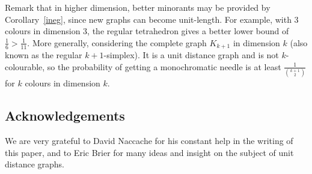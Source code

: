 \documentclass[a4paper,11pt]{article}
\theoremstyle{definition}
\theoremstyle{remark}
\begin{document}
Remark that in higher dimension, better minorants may be provided by 
Corollary~\ref{ineg}, since new graphs can 
become unit-length. For example, with $3$ colours in dimension $3$, the regular 
tetrahedron gives a better lower bound 
of $\frac 1 6 >\frac 1 {11}$. More generally, considering the complete graph 
$K_{k+1}$ in dimension $k$ (also known as the regular $k+1$-simplex). It is a unit distance graph and is not $k$-colourable, so the 
probability of getting a monochromatic needle is at least $\frac{1}{\binom{k+1}{2}}$ 
for $k$ colours in dimension $k$.

\subsection*{Acknowledgements}
We are very grateful to David Naccache for his constant help in the writing of
this paper, and to Eric Brier for many ideas and insight on the subject of 
unit distance graphs.



\end{document}
